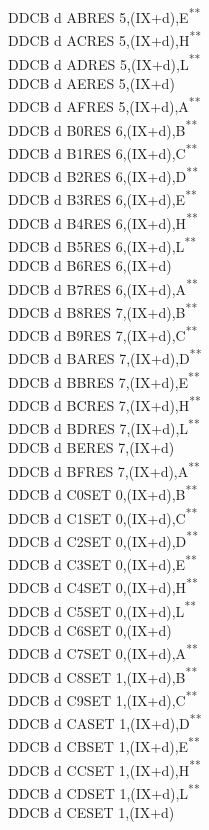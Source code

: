 \documentclass[12pt,twoside,openright,a4paper]{book}
\newcommand{\UNDOC}{\textnormal{\textsuperscript{**}}}
\begin{document}
\begin{multicols}{3}
{\begin{tabbing}
	DDCB d AB\>RES 5,(IX+d),E\UNDOC\\
	DDCB d AC\>RES 5,(IX+d),H\UNDOC\\
	DDCB d AD\>RES 5,(IX+d),L\UNDOC\\
	DDCB d AE\>RES 5,(IX+d)\\
	DDCB d AF\>RES 5,(IX+d),A\UNDOC\\
	DDCB d B0\>RES 6,(IX+d),B\UNDOC\\
	DDCB d B1\>RES 6,(IX+d),C\UNDOC\\
	DDCB d B2\>RES 6,(IX+d),D\UNDOC\\
	DDCB d B3\>RES 6,(IX+d),E\UNDOC\\
	DDCB d B4\>RES 6,(IX+d),H\UNDOC\\
	DDCB d B5\>RES 6,(IX+d),L\UNDOC\\
	DDCB d B6\>RES 6,(IX+d)\\
	DDCB d B7\>RES 6,(IX+d),A\UNDOC\\
	DDCB d B8\>RES 7,(IX+d),B\UNDOC\\
	DDCB d B9\>RES 7,(IX+d),C\UNDOC\\
	DDCB d BA\>RES 7,(IX+d),D\UNDOC\\
	DDCB d BB\>RES 7,(IX+d),E\UNDOC\\
	DDCB d BC\>RES 7,(IX+d),H\UNDOC\\
	DDCB d BD\>RES 7,(IX+d),L\UNDOC\\
	DDCB d BE\>RES 7,(IX+d)\\
	DDCB d BF\>RES 7,(IX+d),A\UNDOC\\
	DDCB d C0\>SET 0,(IX+d),B\UNDOC\\
	DDCB d C1\>SET 0,(IX+d),C\UNDOC\\
	DDCB d C2\>SET 0,(IX+d),D\UNDOC\\
	DDCB d C3\>SET 0,(IX+d),E\UNDOC\\
	DDCB d C4\>SET 0,(IX+d),H\UNDOC\\
	DDCB d C5\>SET 0,(IX+d),L\UNDOC\\
	DDCB d C6\>SET 0,(IX+d)\\
	DDCB d C7\>SET 0,(IX+d),A\UNDOC\\
	DDCB d C8\>SET 1,(IX+d),B\UNDOC\\
	DDCB d C9\>SET 1,(IX+d),C\UNDOC\\
	DDCB d CA\>SET 1,(IX+d),D\UNDOC\\
	DDCB d CB\>SET 1,(IX+d),E\UNDOC\\
	DDCB d CC\>SET 1,(IX+d),H\UNDOC\\
	DDCB d CD\>SET 1,(IX+d),L\UNDOC\\
	DDCB d CE\>SET 1,(IX+d)\\

\end{tabbing}}
\end{multicols}
\end{document}
